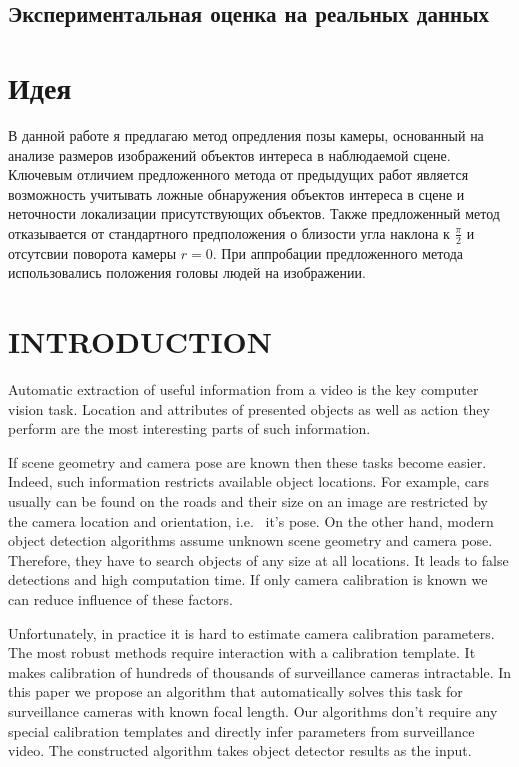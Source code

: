 \subsection{Экспериментальная оценка на реальных данных}

\section{Идея}

В данной работе я предлагаю метод опредления позы камеры, основанный на анализе размеров изображений объектов интереса в наблюдаемой сцене. Ключевым отличием предложенного метода от предыдущих работ является возможность учитывать ложные обнаружения объектов интереса в сцене и неточности локализации присутствующих объектов. Также предложенный метод отказывается от стандартного предположения о близости угла наклона к 
$\frac{\pi}{2}$
и отсутсвии поворота камеры $r=0$. 
При аппробации предложенного метода использовались положения головы людей на изображении.

\section{\uppercase{Introduction}}
\label{sec:introduction}

\noindent Automatic extraction of useful information from a video is the key computer vision task. Location and attributes of presented objects as well as action they perform are the most interesting parts of such information.

If scene geometry and camera pose are known then these tasks become easier. Indeed, such information restricts available object locations. For example, cars usually can be found on the roads and their size on an image are restricted by the camera location and orientation, i.e.~ it's pose. On the other hand, modern object detection algorithms assume unknown scene geometry and camera pose. Therefore, they have to search objects of any size at all locations. It leads to false detections and high computation time. If only camera calibration is known we can reduce influence of these factors.

Unfortunately, in practice it is hard to estimate camera calibration parameters. The most robust methods require interaction with a calibration template. It makes calibration of hundreds of thousands of surveillance cameras intractable. In this paper we propose an algorithm that automatically solves this task for surveillance cameras with known focal length. Our algorithms don't require any special calibration templates and directly infer parameters from surveillance video. The constructed algorithm takes object detector results as the input.

